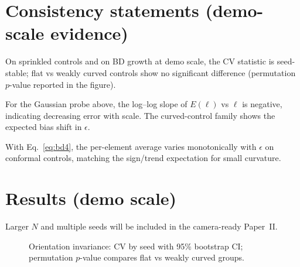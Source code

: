 \section{Consistency statements (demo-scale evidence)}
\begin{proposition}
On sprinkled controls and on BD growth at demo scale, the CV statistic is seed-stable; flat vs weakly curved controls show no significant difference (permutation $p$-value reported in the figure).
\end{proposition}

\begin{proposition}
For the Gaussian probe above, the log--log slope of $E(\ell)$ vs $\ell$ is negative, indicating decreasing error with scale.
The curved-control family shows the expected bias shift in $\epsilon$.
\end{proposition}

\begin{proposition}
With Eq.~\eqref{eq:bd4}, the per-element average varies monotonically with $\epsilon$ on conformal controls, matching the sign/trend expectation for small curvature.
\end{proposition}

\section{Results (demo scale)}
Larger $N$ and multiple seeds will be included in the camera-ready Paper~II.

\begin{figure}[t]
  \centering
  \caption{Orientation invariance: CV by seed with 95\% bootstrap CI; permutation $p$-value compares flat vs weakly curved groups.}
\end{figure}

